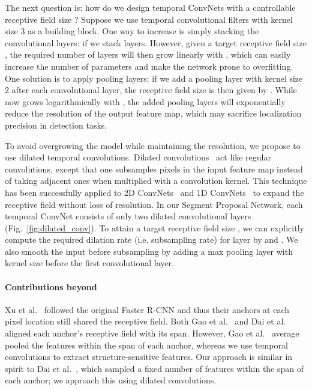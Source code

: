 \documentclass[10pt,twocolumn,letterpaper]{article}
\begin{document}
The next question is: how do we design temporal ConvNets with a controllable
receptive field size ? Suppose we use temporal convolutional filters with
kernel size 3 as a building block. One way to increase  is simply stacking
the convolutional layers:  if we stack  layers. However, given a
target receptive field size , the required number of layers  will then
grow linearly with , which can easily increase the number of parameters and
make the network prone to overfitting. One solution is to apply pooling layers:
if we add a pooling layer with kernel size 2 after each convolutional layer,
the receptive field size is then given by . While now  grows
logarithmically with , the added pooling layers will exponentially reduce
the resolution of the output feature map, which may sacrifice localization
precision in detection tasks.

To avoid overgrowing the model while maintaining the resolution, we propose to
use dilated temporal convolutions. Dilated
convolutions~\cite{chen:iclr2015,yu:iclr2016} act like regular convolutions,
except that one subsamples pixels in the input feature map instead of taking
adjacent ones when multiplied with a convolution kernel. This technique has
been successfully applied to 2D ConvNets~\cite{chen:iclr2015,yu:iclr2016} and
1D ConvNets~\cite{lea:cvpr2017} to expand the receptive field without loss of
resolution. In our Segment Proposal Network, each temporal ConvNet consists of
only two dilated convolutional layers (Fig.~\ref{fig:dilated_conv}). To attain
a target receptive field size , we can explicitly compute the required
dilation rate (i.e. subsampling rate)  for layer  by  and
. We also smooth the input before subsampling by adding a max
pooling layer with kernel size  before the first convolutional layer.

\vspace{-3mm}

\paragraph{Contributions
beyond~\cite{dai:iccv2017,gao:bmvc2017,gao:iccv2017,xu:iccv2017}} Xu et
al.~\cite{xu:iccv2017} followed the original Faster R-CNN and thus their
anchors at each pixel location still shared the receptive field. Both Gao et
al.~\cite{gao:bmvc2017,gao:iccv2017} and Dai et al.~\cite{dai:iccv2017} aligned
each anchor's receptive field with its span. However, Gao et
al.~\cite{gao:bmvc2017,gao:iccv2017} average pooled the features within the
span of each anchor, whereas we use temporal convolutions to extract
structure-sensitive features. Our approach is similar in spirit to Dai et
al.~\cite{dai:iccv2017}, which sampled a fixed number of features within the
span of each anchor; we approach this using dilated convolutions.
\end{document}
